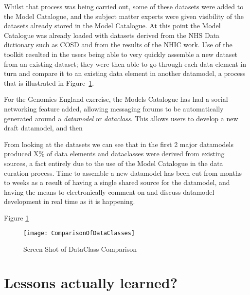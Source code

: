 Whilst that process was being carried out, some of these datasets were
added to the Model Catalogue, and the subject matter experts were
given visibility of the datasets already stored in the Model
Catalogue. At this point the Model Catalogue was already loaded with
datasets derived from the NHS Data dictionary such as COSD and from
the results of the NHIC work. Use of the toolkit resulted in the users
being able to very quickly assemble a new dataset from an existing
dataset; they were then able to go through each data element in turn
and compare it to an existing data element in another datamodel, a
process that is illustrated in Figure~\ref{fig:dataClassComparison}.

For the Genomics England exercise, the Models Catalogue has had a
social networking feature added, allowing messaging forums to be
automatically generated around a \emph{datamodel} or
\emph{dataclass}. This allows users to develop a new draft datamodel,
and then

From looking at the datasets we can see that in the first 2 major
datamodels produced X\% of data elements and dataclasses were derived
from existing sources, a fact entirely due to the use of the Model
Catalogue in the data curation process. Time to assemble a new
datamodel has been cut from months to weeks as a result of having a
single shared source for the datamodel, and having the means to
electronically comment on and discuss datamodel development in real
time as it is happening.



 Figure \ref{fig:dataClassComparison}
 \begin{figure}[here]
 	\texttt{[image: ComparisonOfDataClasses]}
 	\caption{Screen Shot of DataClass Comparison} 
 	\label{fig:dataClassComparison}	
 \end{figure}


\section{Lessons actually learned?}


